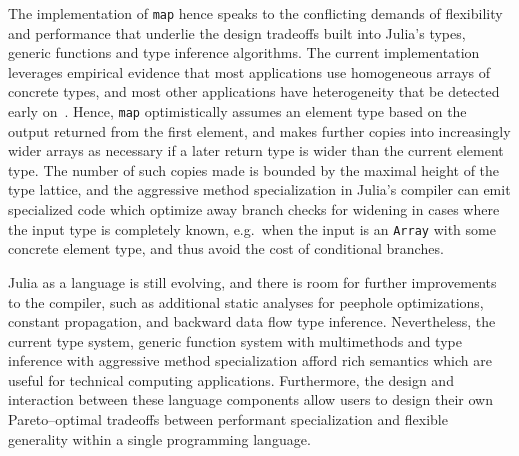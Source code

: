 \documentclass[pldi]{sigplanconf-pldi15}
\begin{document}
The implementation of \verb|map| hence speaks to the conflicting demands of
flexibility and performance that underlie the design tradeoffs built into
Julia's types, generic functions and type inference algorithms. The current
implementation leverages empirical evidence that most applications use
homogeneous arrays of concrete types, and most other applications have
heterogeneity that be detected early on~\cite{Bolz2013}. Hence, \verb|map|
optimistically assumes an element type based on the output returned from the
first element, and makes further copies into increasingly wider arrays as
necessary if a later return type is wider than the current element type. The
number of such copies made is bounded by the maximal height of the type
lattice, and the aggressive method specialization in Julia's compiler can emit
specialized code which optimize away branch checks for widening in cases where
the input type is completely known, e.g.\ when the input is an \verb|Array|
with some concrete element type, and thus avoid the cost of conditional
branches.

Julia as a language is still evolving, and there is room for further
improvements to the compiler, such as additional static analyses for peephole
optimizations, constant propagation, and backward data flow type inference.
Nevertheless, the current type system, generic function system with
multimethods and type inference with aggressive method specialization afford
rich semantics which are useful for technical computing applications.
Furthermore, the design and interaction between these language components allow
users to design their own Pareto--optimal tradeoffs between performant
specialization and flexible generality within a single programming language.



\listoftodos %



\end{document}

